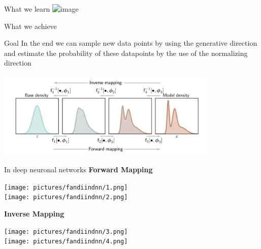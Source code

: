\documentclass[aspectratio=169,xcolor=dvipsnames]{beamer}
\begin{document}
\begin{frame}{What we learn}
    \centering
    \includegraphics<4>[width=0.8\textwidth]{pictures/tof.png}
\end{frame}


\begin{frame}{What we achieve}
  \begin{block}{Goal}
    In the end we can sample new data points by using the generative direction and estimate the probability of these datapoints by the use of the normalizing direction
  \end{block}
  
  \begin{center}
  \includegraphics[width=0.8\textwidth]{pictures/forandinv.png}
  \end{center}
\end{frame}


\begin{frame}{In deep neuronal networks}
\textbf{Forward Mapping}
\begin{center}
  \texttt{[image: pictures/fandiindnn/1.png]}\\[0.4cm]
  \texttt{[image: pictures/fandiindnn/2.png]}
\end{center}
\vspace{0.4cm}

\textbf{Inverse Mapping}
\begin{center}
  \texttt{[image: pictures/fandiindnn/3.png]}\\[0.4cm]
  \texttt{[image: pictures/fandiindnn/4.png]}
\end{center}
\end{frame}

\end{document}
